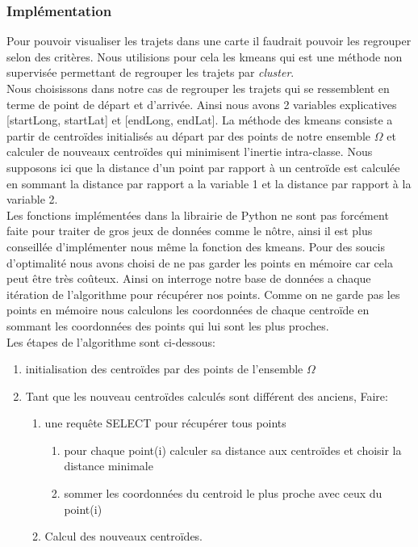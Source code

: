 \documentclass[]{report}
\begin{document}
	\subsubsection{Implémentation}
	Pour pouvoir visualiser les trajets dans une carte il faudrait pouvoir les regrouper selon des critères. Nous utilisions pour cela  les kmeans qui est une méthode non supervisée permettant de regrouper les trajets par \textit{cluster}. \\
	Nous choisissons dans notre cas de regrouper les trajets qui se ressemblent en terme de point de départ et d'arrivée. Ainsi nous avons 2 variables explicatives [startLong, startLat] et [endLong, endLat].
	La méthode des kmeans consiste a partir de centroïdes initialisés au départ par des points de notre ensemble $\Omega$ et calculer de nouveaux centroïdes qui minimisent l'inertie intra-classe. Nous supposons ici que la distance d'un point par rapport à un centroïde est calculée en sommant la distance par rapport a la variable 1 et la distance par rapport à la variable 2.\\
	Les fonctions implémentées dans la librairie de Python ne sont pas forcément faite pour traiter de gros jeux de données comme le nôtre, ainsi il est plus conseillée d'implémenter nous même la fonction des kmeans. Pour des soucis d'optimalité nous avons choisi de ne pas garder les points en mémoire car cela peut être très coûteux. Ainsi on interroge notre base de données a chaque itération de l'algorithme pour récupérer nos points. Comme on ne garde pas les points en mémoire nous calculons les coordonnées de chaque centroïde en sommant les coordonnées des points qui lui sont les plus proches. \\
	Les étapes de l'algorithme sont  ci-dessous:
	\begin{enumerate}
		\item initialisation des centroïdes par des points de l'ensemble $\Omega$
		\item Tant que les nouveau centroïdes calculés sont différent des anciens, Faire:
		\begin{enumerate}
			\item une requête SELECT pour récupérer tous points
			\begin{enumerate}
				\item pour chaque point(i) calculer sa distance aux centroïdes et choisir la distance minimale
				\item sommer les coordonnées du centroid le plus proche avec ceux du point(i)
			\end{enumerate}
			\item Calcul des nouveaux centroïdes.
		\end{enumerate}
	\end{enumerate}
	
\end{document}
